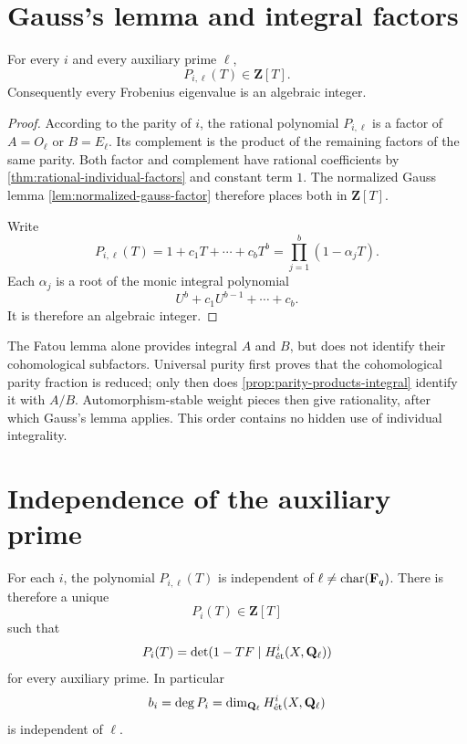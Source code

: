 \section{Gauss's lemma and integral factors}

\begin{theorem}
\label{thm:integral-frobenius-factors}
For every \(i\) and every auxiliary prime \(\ell\),
\[
  P_{i,\ell}(T)\in\mathbf Z[T].
\]
Consequently every Frobenius eigenvalue is an algebraic integer.
\end{theorem}

\begin{proof}
According to the parity of \(i\), the rational polynomial
\(P_{i,\ell}\) is a factor of \(A=O_\ell\) or \(B=E_\ell\).  Its
complement is the product of the remaining factors of the same parity.
Both factor and complement have rational coefficients by
\cref{thm:rational-individual-factors} and constant term \(1\).  The
normalized Gauss lemma \cref{lem:normalized-gauss-factor} therefore
places both in \(\mathbf Z[T]\).

Write
\[
 P_{i,\ell}(T)=1+c_1T+\cdots+c_bT^b
              =\prod_{j=1}^b(1-\alpha_jT).
\]
Each \(\alpha_j\) is a root of the monic integral polynomial
\[
 U^b+c_1U^{b-1}+\cdots+c_b.
\]
It is therefore an algebraic integer.
\end{proof}

\begin{remark}
The Fatou lemma alone provides integral \(A\) and \(B\), but does not
identify their cohomological subfactors.  Universal purity first proves
that the cohomological parity fraction is reduced; only then does
\cref{prop:parity-products-integral} identify it with \(A/B\).
Automorphism-stable weight pieces then give rationality, after which
Gauss's lemma applies.  This order contains no hidden use of individual
integrality.
\end{remark}

\section{Independence of the auxiliary prime}

\begin{theorem}
\label{thm:ell-independence}
For each \(i\), the polynomial \(P_{i,\ell}(T)\) is independent of
\(\ell\neq\operatorname{char}(\mathbf F_q)\).  There is therefore a unique
\[
  P_i(T)\in\mathbf Z[T]
\]
such that
\[
  P_i(T)=\det(1-TF\mid H^i_{\mathrm{\acute et}}(X,\mathbf Q_\ell))
\]
for every auxiliary prime.  In particular
\[
  b_i=\deg P_i=\dim_{\mathbf Q_\ell}H^i_{\mathrm{\acute et}}(X,\mathbf Q_\ell)
\]
is independent of \(\ell\).
\end{theorem}

